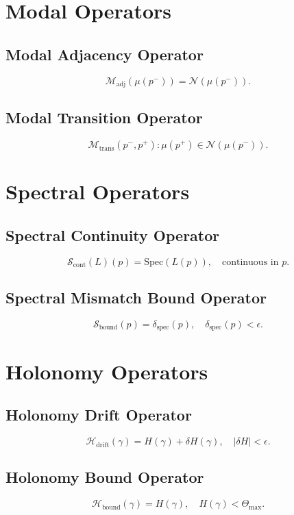 \documentclass[11pt]{article}
\begin{document}
\section{Modal Operators}

\subsection{Modal Adjacency Operator}
\[
\mathcal{M}_{\mathrm{adj}}(\mu(p^-)) = \mathcal{N}(\mu(p^-)).
\]

\subsection{Modal Transition Operator}
\[
\mathcal{M}_{\mathrm{trans}}(p^-,p^+) :
\mu(p^+) \in \mathcal{N}(\mu(p^-)).
\]

\section{Spectral Operators}

\subsection{Spectral Continuity Operator}
\[
\mathcal{S}_{\mathrm{cont}}(L)(p)
  = \mathrm{Spec}(L(p)),
\quad \text{continuous in } p.
\]

\subsection{Spectral Mismatch Bound Operator}
\[
\mathcal{S}_{\mathrm{bound}}(p)
  = \delta_{\mathrm{spec}}(p),
\quad \delta_{\mathrm{spec}}(p) < \epsilon.
\]

\section{Holonomy Operators}

\subsection{Holonomy Drift Operator}
\[
\mathcal{H}_{\mathrm{drift}}(\gamma)
  = H(\gamma) + \delta H(\gamma),
\quad |\delta H| < \epsilon.
\]

\subsection{Holonomy Bound Operator}
\[
\mathcal{H}_{\mathrm{bound}}(\gamma)
  = H(\gamma),
\quad H(\gamma) < \Theta_{\max}.
\]
\end{document}
